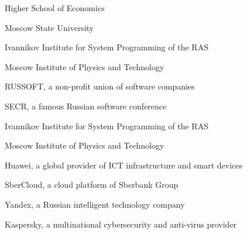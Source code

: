 \clearpage
{}

\newcommand\partner[1]{\newline}

\begin{multicols}{2}
\partner{partners/hse}
Higher School of Economics

\partner{partners/msu}
Moscow State University

\columnbreak

\partner{partners/isp}
Ivannikov Institute for System Programming of the RAS

\partner{partners/mipt}
Moscow Institute of Physics and Technology
\end{multicols}

\begin{multicols}{2}
\partner{partners/russoft}
RUSSOFT, a non-profit union of software companies

\partner{partners/secr}
SECR, a famous Russian software conference

\columnbreak

\partner{partners/isp}
Ivannikov Institute for System Programming of the RAS

\partner{partners/mipt}
Moscow Institute of Physics and Technology
\end{multicols}


\begin{multicols}{2}
\partner{partners/huawei}
Huawei, a global provider of ICT infrastructure and smart devices

\partner{partners/sbercloud}
SberCloud, a cloud platform of Sberbank Group

\columnbreak

\partner{partners/yandex}
Yandex, a Russian intelligent technology company

\partner{partners/kaspersky}
Kaspersky, a multinational cybersecurity and anti-virus provider
\end{multicols}
